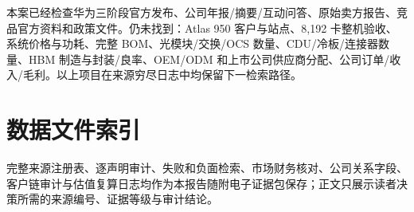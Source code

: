 本案已经检查华为三阶段官方发布、公司年报/摘要/互动问答、原始卖方报告、竞品官方资料和政策文件。仍未找到：Atlas 950 客户与站点、8,192 卡整机验收、系统价格与功耗、完整 BOM、光模块/交换/OCS 数量、CDU/冷板/连接器数量、HBM 制造与封装/良率、OEM/ODM 和上市公司供应商分配、公司订单/收入/毛利。以上项目在来源穷尽日志中均保留下一检索路径。

\section{数据文件索引}

完整来源注册表、逐声明审计、失败和负面检索、市场财务核对、公司关系字段、客户链审计与估值复算日志均作为本报告随附电子证据包保存；正文只展示读者决策所需的来源编号、证据等级与审计结论。
